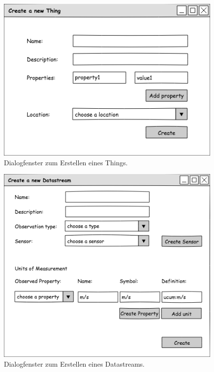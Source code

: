 \documentclass[12 pt]{article}
\begin{document}
\begin{figure}[ht]
\centering
\includegraphics[scale=1]{images/create_thing}
\caption{\label{fig:thing}Dialogfenster zum Erstellen eines Things.}
\end{figure}

\begin{figure}[ht]
\centering
\includegraphics[scale=1]{images/create_datastream}
\caption{\label{fig:ds}Dialogfenster zum Erstellen eines Datastreams.}
\end{figure}
\end{document}
